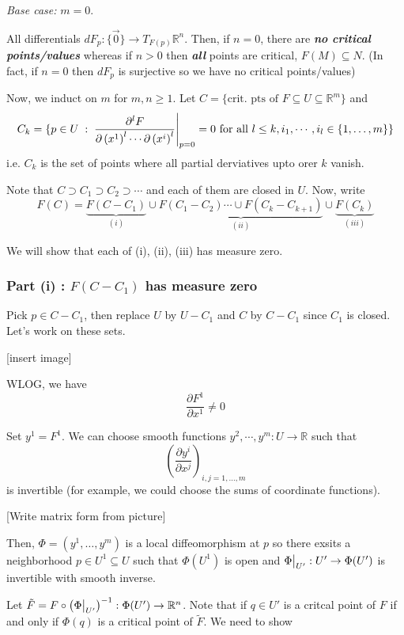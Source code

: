 \documentclass{article}
\newcommand{\R}{\mathbb{R}}
\newcommand{\restr}[2]{{%
  \left.\kern-\nulldelimiterspace %
  #1 %
  \vphantom{\big|} %
  \right|_{#2} %
  }}
\begin{document}
\vskip 0.5cm
\emph{Base case:} $m = 0$.

\vskip 0.25cm
All differentials $dF_p : \{\vec{0}\} \rightarrow T_{F(p)} \R^n$. Then, if $n = 0$, there are \emph{\textbf{no critical points/values}} whereas if $n > 0$ then \emph{\textbf{all}} points are critical, $F(M) \subseteq N$. (In fact, if $n = 0$ then $dF_p$ is surjective so we have no critical points/values)

\vskip 0.25cm
Now, we induct on $m$ for $m, n \geq 1$. Let $C = \{ \text{crit. pts of $F$} \subseteq U \subseteq \R^m \}$ and 
\[ C_k = \{p \in U \;:\; \restr{\frac{\partial^{l} F}{\partial \left(x^1\right)^l \cdots \partial \left(x^i\right)^l}}{p = 0} = 0 \text{ for all } l \leq k, i_1, \cdots, i_l \in \{1, \dots, m\} \} \] i.e. $C_k$ is the set of points where all partial derviatives upto orer $k$ vanish.

\vskip 0.25cm
Note that $C \supset C_1 \supset C_2 \supset \cdots $ and each of them are closed in $U$. Now,  write 
\[ F(C) = \underbrace{F(C - C_1) }_{(i)} \cup\underbrace{ F(C_1 - C_2) \cdots \cup F(C_k - C_{k+1})}_{(ii)} \cup \underbrace{F(C_k)}_{(iii)} \]

\vskip 0.25cm
We will show that each of (i), (ii), (iii) has measure zero.

\vskip 0.25cm
\subsubsection*{Part (i) : $F(C - C_1)$ has measure zero}
Pick $p \in C - C_1$, then replace $U$ by $U - C_1$ and $C$ by $C - C_1$ since $C_1$ is closed. Let's work on these sets. 

\vskip 0.25cm
[insert image]

\vskip 0.25cm
WLOG, we have 
\[ \frac{\partial F^1}{\partial x^1} \neq 0 \]

Set $y^1 = F^1$. We can choose smooth functions $y^2, \cdots, y^m : U \rightarrow \R$ such that 
\[ \left(  \frac{\partial y^i}{\partial x^j}  \right)_{i , j = 1, \dots, m} \]
is invertible (for example, we could choose the sums of coordinate functions).

\vskip 0.25cm
[Write matrix form from picture]

\vskip 0.25cm
Then, $\Phi = \left(y^1, \dots, y^m \right)$ is a local diffeomorphism at $p$ so there exsits a neighborhood $p \in U^1 \subseteq U$ such that $\Phi\left( U^1 \right)$ is open and $\restr{\Phi}{U'} : U' \rightarrow \Phi(U')$ is invertible with smooth inverse.

\vskip 0.25cm
Let $\tilde{F} = F \circ \left( \restr{\Phi}{U'} \right)^{-1} : \Phi(U') \rightarrow \R^n$. Note that if $q \in U'$ is a critcal point of $F$ if and only if $\Phi(q)$ is a critical point of $\tilde{F}$. We need to show 
\end{document}
